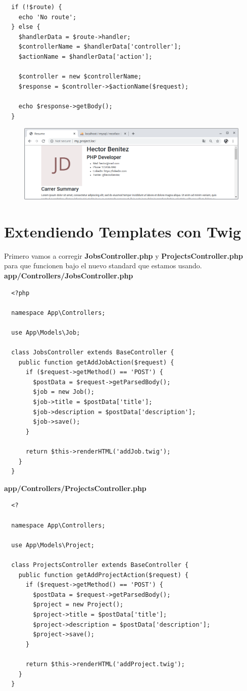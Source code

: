 \documentclass{article}
\begin{document}
\begin{verbatim}
  if (!$route) {
    echo 'No route';
  } else {
    $handlerData = $route->handler;
    $controllerName = $handlerData['controller'];
    $actionName = $handlerData['action'];

    $controller = new $controllerName;
    $response = $controller->$actionName($request);

    echo $response->getBody();
  }
\end{verbatim}

\begin{figure}[h!]
  \centering
  \includegraphics[scale=0.5]{./Pictures/156_PSR7_complete.png}
\end{figure}

\newpage


\section{Extendiendo Templates con Twig}%

Primero vamos a corregir \textbf{JobsController.php} y
\textbf{ProjectsController.php} para que funcionen bajo el nuevo standard que
estamos usando.\\

\textbf{app/Controllers/JobsController.php}
\begin{verbatim}
  <?php

  namespace App\Controllers;

  use App\Models\Job;

  class JobsController extends BaseController {
    public function getAddJobAction($request) {
      if ($request->getMethod() == 'POST') {
        $postData = $request->getParsedBody();
        $job = new Job();
        $job->title = $postData['title'];
        $job->description = $postData['description'];
        $job->save();
      }

      return $this->renderHTML('addJob.twig');
    }
  }
\end{verbatim}

\textbf{app/Controllers/ProjectsController.php}
\begin{verbatim}
  <?

  namespace App\Controllers;

  use App\Models\Project;

  class ProjectsController extends BaseController {
    public function getAddProjectAction($request) {
      if ($request->getMethod() == 'POST') {
        $postData = $request->getParsedBody();
        $project = new Project();
        $project->title = $postData['title'];
        $project->description = $postData['description'];
        $project->save();
      }

      return $this->renderHTML('addProject.twig');
    }
  }
\end{verbatim}
\end{document}
